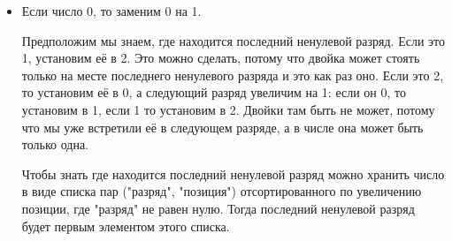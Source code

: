 \documentclass{article}
\begin{document}
\begin{itemize}
        Если $a \geq b+1$, то по лемме 1, $a \geq 2^{\text{длина
        a}}-1\geq2^{\text{длина b}+1}-1 > 2^{\text{длина b}+1}-2 \geq b$

        В противном случае предположим $n=\text{значение }\tau(=\text{значение }\pi$,
        тогда по лемме 1, 
        
        $a0\ldots0(n \text{нулей})\\
        \geq (b+1)0\ldots0(n \text{нулей}) = b0\ldots0(n \text{нулей}) + (2^{n+1}-1)\\
        > b0\ldots0(n\text{нулей}) + \pi = b\pi$ 

        Тогда 

        $a = \rho\alpha\tau \geq \rho0\ldots0(n+1\text{раз})+a0\ldots0(n\text{раз})\\
        > \rho0\ldots0(n+1\text{раз}) + \beta\pi = \rho\beta\pi = b$.

        Доказательство из \verb|https://publications.mpi-cbg.de/Myers_1983_6328.pdf|

    \item Если число 0, то заменим 0 на 1.

        Предположим мы знаем, где находится последний ненулевой разряд. Если
        это 1, установим её в 2. Это можно сделать, потому что двойка может
        стоять только на месте последнего ненулевого разряда и это как раз оно.
        Если это 2, то установим её в 0, а следующий разряд увеличим на 1: если
        он 0, то установим в 1, если 1 то установим в 2. Двойки там быть не
        может, потому что мы уже встретили её в следующем разряде, а в числе
        она может быть только одна.

        Чтобы знать где находится последний ненулевой разряд можно хранить
        число в виде списка пар ("разряд", "позиция") отсортированного по
        увеличению позиции, где "разряд" не равен нулю. Тогда последний 
        ненулевой разряд будет первым элементом этого списка.

\end{itemize}

\section{}
\end{document}
